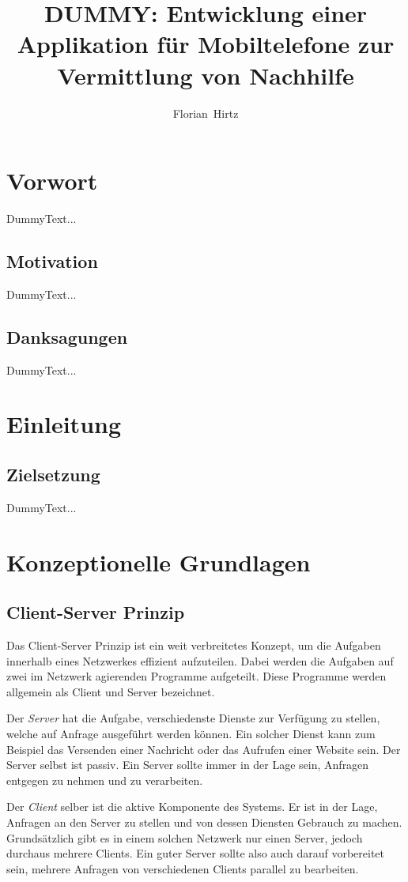 \documentclass[a4paper,11pt]{report}
\author{Florian~Hirtz}
\title{DUMMY: Entwicklung einer Applikation für Mobiltelefone zur Vermittlung von Nachhilfe}
\begin{document}
	\maketitle
	\tableofcontents
	
	
	\chapter{Vorwort}
	DummyText...
		\section{Motivation}
		DummyText...
		\section{Danksagungen}
		DummyText...
	
	\chapter{Einleitung}
		\section{Zielsetzung}
		DummyText...
	
	\chapter{Konzeptionelle Grundlagen}
		\section{Client-Server Prinzip}
		Das Client-Server Prinzip ist ein weit verbreitetes Konzept, um die Aufgaben innerhalb eines Netzwerkes effizient aufzuteilen. Dabei werden die Aufgaben auf zwei im Netzwerk agierenden Programme aufgeteilt. Diese Programme werden allgemein als Client und Server bezeichnet.
	 
		Der \emph{Server} hat die Aufgabe, verschiedenste Dienste zur Verfügung zu stellen, welche auf Anfrage ausgeführt werden können. Ein solcher Dienst kann zum Beispiel das Versenden einer Nachricht oder das Aufrufen einer Website sein. Der Server selbst ist passiv. Ein Server sollte immer in der Lage sein, Anfragen entgegen zu nehmen und zu verarbeiten.
	
		Der \emph{Client} selber ist die aktive Komponente des Systems. Er ist in der Lage, Anfragen an den Server zu stellen und von dessen Diensten Gebrauch zu machen.
		Grundsätzlich gibt es in einem solchen Netzwerk nur einen Server, jedoch durchaus mehrere Clients. Ein guter Server sollte also auch darauf vorbereitet sein, mehrere Anfragen von verschiedenen Clients parallel zu bearbeiten. \cite{fachadmin.de:ServerClient}
		
\end{document}
